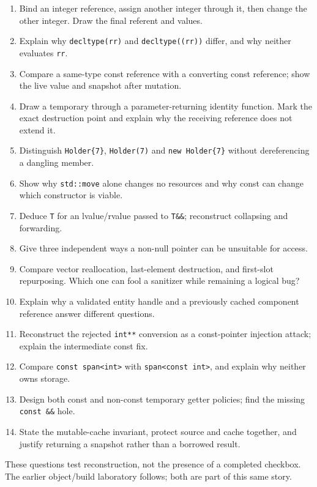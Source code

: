\begin{enumerate}
\def\labelenumi{\arabic{enumi}.}
\tightlist
\item
  Bind an integer reference, assign another integer through it, then change the other integer. Draw the final referent and values.
\item
  Explain why \texttt{decltype(rr)} and \texttt{decltype((rr))} differ, and why neither evaluates \texttt{rr}.
\item
  Compare a same-type const reference with a converting const reference; show the live value and snapshot after mutation.
\item
  Draw a temporary through a parameter-returning identity function. Mark the exact destruction point and explain why the receiving reference does not extend it.
\item
  Distinguish \texttt{Holder\{7\}}, \texttt{Holder(7)} and \texttt{new\ Holder\{7\}} without dereferencing a dangling member.
\item
  Show why \texttt{std::move} alone changes no resources and why const can change which constructor is viable.
\item
  Deduce \texttt{T} for an lvalue/rvalue passed to \texttt{T\&\&}; reconstruct collapsing and forwarding.
\item
  Give three independent ways a non-null pointer can be unsuitable for access.
\item
  Compare vector reallocation, last-element destruction, and first-slot repurposing. Which one can fool a sanitizer while remaining a logical bug?
\item
  Explain why a validated entity handle and a previously cached component reference answer different questions.
\item
  Reconstruct the rejected \texttt{int**} conversion as a const-pointer injection attack; explain the intermediate const fix.
\item
  Compare \texttt{const\ span\textless{}int\textgreater{}} with \texttt{span\textless{}const\ int\textgreater{}}, and explain why neither owns storage.
\item
  Design both const and non-const temporary getter policies; find the missing \texttt{const\ \&\&} hole.
\item
  State the mutable-cache invariant, protect source and cache together, and justify returning a snapshot rather than a borrowed result.
\end{enumerate}

These questions test reconstruction, not the presence of a completed checkbox. The earlier object/build laboratory follows; both are part of this same story.

